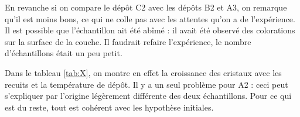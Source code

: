 \documentclass[a4paper,12pt,oneside]{article}
\begin{document}
En revanche si on compare le dépôt C2 avec les dépôts B2 et A3, on remarque qu'il est moins bons, ce qui ne colle pas avec les attentes qu'on a de l'expérience. Il est possible que l'échantillon ait été abîmé : il avait été observé des colorations sur la surface de la couche. Il faudrait refaire l'expérience, le nombre d'échantillons était un peu petit.

Dans le tableau \ref{tab:X}, on montre en effet la croissance des cristaux avec les recuits et la température de dépôt. Il y a un seul problème pour A2 : ceci peut s'expliquer par l'origine légèrement différente des deux échantillons. Pour ce qui est du reste, tout est cohérent avec les hypothèse initiales.



\begin{figure}[!ht]
	\centering
	\\
	\\
	\hfill
\end{figure}
\end{document}
